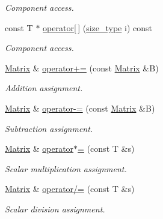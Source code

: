 \begin{DoxyCompactItemize}
\begin{DoxyCompactList}\small\item\em Component access. \item\end{DoxyCompactList}\item 
\hypertarget{classhdnum_1_1Matrix_acd7aa64f80d71dabe9f7d02749dd067e}{
const T $\ast$ \hyperlink{classhdnum_1_1Matrix_acd7aa64f80d71dabe9f7d02749dd067e}{operator\mbox{[}$\,$\mbox{]}} (\hyperlink{classhdnum_1_1Matrix_adeafaf5fa5732e0d67f90ffa2119fbf1}{size\_\-type} i) const }
\label{classhdnum_1_1Matrix_acd7aa64f80d71dabe9f7d02749dd067e}

\begin{DoxyCompactList}\small\item\em Component access. \item\end{DoxyCompactList}\item 
\hyperlink{classhdnum_1_1Matrix}{Matrix} \& \hyperlink{classhdnum_1_1Matrix_a4f3f23f9a07540723601283d034c10ae}{operator+=} (const \hyperlink{classhdnum_1_1Matrix}{Matrix} \&B)
\begin{DoxyCompactList}\small\item\em Addition assignment. \item\end{DoxyCompactList}\item 
\hyperlink{classhdnum_1_1Matrix}{Matrix} \& \hyperlink{classhdnum_1_1Matrix_acbc74183e387ce2bc40fa3d785e75a83}{operator-\/=} (const \hyperlink{classhdnum_1_1Matrix}{Matrix} \&B)
\begin{DoxyCompactList}\small\item\em Subtraction assignment. \item\end{DoxyCompactList}\item 
\hyperlink{classhdnum_1_1Matrix}{Matrix} \& \hyperlink{classhdnum_1_1Matrix_adc378774314424fd9c5600bc34bed356}{operator$\ast$=} (const T \&s)
\begin{DoxyCompactList}\small\item\em Scalar multiplication assignment. \item\end{DoxyCompactList}\item 
\hyperlink{classhdnum_1_1Matrix}{Matrix} \& \hyperlink{classhdnum_1_1Matrix_ac4850f9b5df8da4a8fb40ddf05a3ed39}{operator/=} (const T \&s)
\begin{DoxyCompactList}\small\item\em Scalar division assignment. \item\end{DoxyCompactList}\item 

\end{DoxyCompactItemize}
